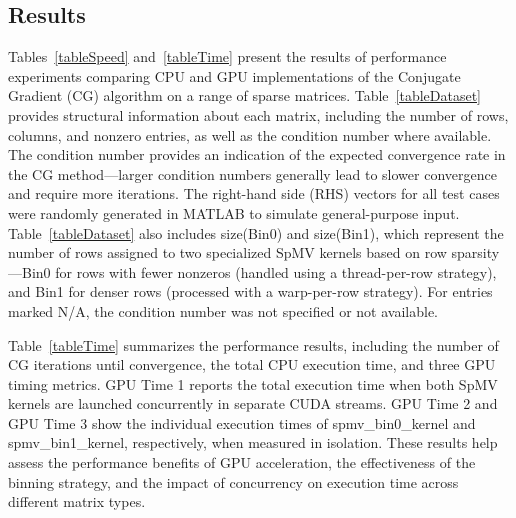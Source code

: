 \documentclass[conference]{IEEEtran}
\begin{document}
\subsection{Results}
Tables~\ref{tableSpeed} and~\ref{tableTime} present the results of performance experiments comparing CPU and GPU implementations of the Conjugate Gradient (CG) algorithm on a range of sparse matrices. Table~\ref{tableDataset} provides structural information about each matrix, including the number of rows, columns, and nonzero entries, as well as the condition number where available. The condition number provides an indication of the expected convergence rate in the CG method—larger condition numbers generally lead to slower convergence and require more iterations. The right-hand side (RHS) vectors for all test cases were randomly generated in MATLAB to simulate general-purpose input. Table~\ref{tableDataset} also includes size(Bin0) and size(Bin1), which represent the number of rows assigned to two specialized SpMV kernels based on row sparsity—Bin0 for rows with fewer nonzeros (handled using a thread-per-row strategy), and Bin1 for denser rows (processed with a warp-per-row strategy). For entries marked N/A, the condition number was not specified or not available.

Table~\ref{tableTime} summarizes the performance results, including the number of CG iterations until convergence, the total CPU execution time, and three GPU timing metrics. GPU Time 1 reports the total execution time when both SpMV kernels are launched concurrently in separate CUDA streams. GPU Time 2 and GPU Time 3 show the individual execution times of spmv\_bin0\_kernel and spmv\_bin1\_kernel, respectively, when measured in isolation. These results help assess the performance benefits of GPU acceleration, the effectiveness of the binning strategy, and the impact of concurrency on execution time across different matrix types.
\end{document}
